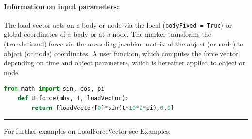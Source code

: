 \paragraph{Information on input parameters:} 
\finishTable
 \noindent
    The load vector acts on a body or node via the local (\texttt{bodyFixed = True}) or global coordinates of a body or at a node. 
    The marker transforms the (translational) force via the according jacobian matrix of the object (or node) to object (or node) coordinates.
    A user function, which computes the force vector depending on time and object parameters, which is hereafter applied to object or node.
    \finishTable
    \userFunctionExample{}
    \pythonstyle
    \begin{lstlisting}[language=Python]
    from math import sin, cos, pi
    def UFforce(mbs, t, loadVector): 
        return [loadVector[0]*sin(t*10*2*pi),0,0]
    \end{lstlisting}
\vspace{6pt}\par\noindent\rule{\textwidth}{0.4pt}
%
\noindent For further examples on LoadForceVector see Examples:
\bi
